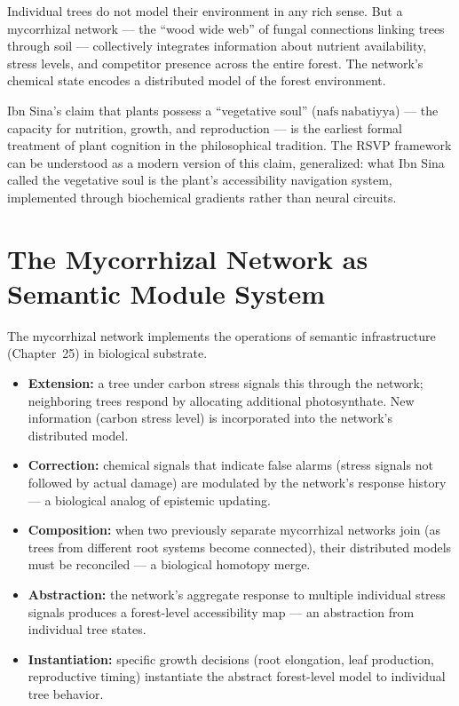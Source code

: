 Individual trees do not model their environment in any rich sense.
But a mycorrhizal network — the ``wood wide web'' of fungal connections
linking trees through soil — collectively integrates information about
nutrient availability, stress levels, and competitor presence across
the entire forest. The network's chemical state encodes a distributed
model of the forest environment.

\begin{historynote}
  Ibn Sina's claim that plants possess a ``vegetative soul'' ($\mathrm{nafs
  \ nabatiyya}$) — the capacity for nutrition, growth, and reproduction —
  is the earliest formal treatment of plant cognition in the philosophical
  tradition. The RSVP framework can be understood as a modern version of
  this claim, generalized: what Ibn Sina called the vegetative soul is
  the plant's accessibility navigation system, implemented through
  biochemical gradients rather than neural circuits.
\end{historynote}

\section{The Mycorrhizal Network as Semantic Module System}

The mycorrhizal network implements the operations of semantic infrastructure
(Chapter~25) in biological substrate.

\begin{itemize}
  \item \textbf{Extension:} a tree under carbon stress signals this
        through the network; neighboring trees respond by allocating
        additional photosynthate. New information (carbon stress level)
        is incorporated into the network's distributed model.
  \item \textbf{Correction:} chemical signals that indicate false alarms
        (stress signals not followed by actual damage) are modulated by
        the network's response history — a biological analog of epistemic
        updating.
  \item \textbf{Composition:} when two previously separate mycorrhizal
        networks join (as trees from different root systems become
        connected), their distributed models must be reconciled — a
        biological homotopy merge.
  \item \textbf{Abstraction:} the network's aggregate response to
        multiple individual stress signals produces a forest-level
        accessibility map — an abstraction from individual tree states.
  \item \textbf{Instantiation:} specific growth decisions (root
        elongation, leaf production, reproductive timing) instantiate
        the abstract forest-level model to individual tree behavior.
\end{itemize}

